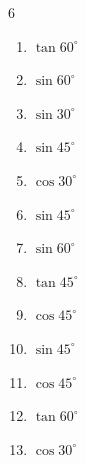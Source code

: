 \begin{multicols}{6}
\begin{enumerate}
  \item $\displaystyle \tan{60^\circ}$


  \item $\displaystyle \sin{60^\circ}$


  \item $\displaystyle \sin{30^\circ}$


  \item $\displaystyle \sin{45^\circ}$


  \item $\displaystyle \cos{30^\circ}$


\columnbreak %

  \item $\displaystyle \sin{45^\circ}$


  \item $\displaystyle \sin{60^\circ}$


  \item $\displaystyle \tan{45^\circ}$

        \phantom{$\displaystyle =1$}

  \item $\displaystyle \cos{45^\circ}$


  \item $\displaystyle \sin{45^\circ}$


  \item $\displaystyle \cos{45^\circ}$


  \item $\displaystyle \tan{60^\circ}$


  \item $\displaystyle \cos{30^\circ}$


\end{enumerate}
\end{multicols}
